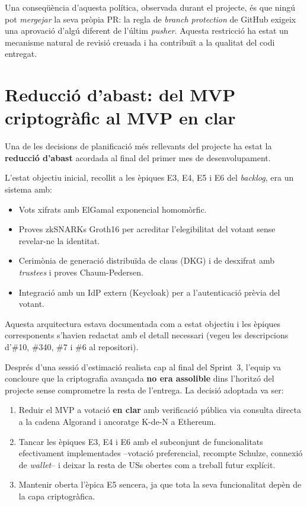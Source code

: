 Una conseqüència d'aquesta política, observada durant el projecte, és que
ningú pot \emph{mergejar} la seva pròpia \ac{PR}: la regla de \emph{branch
protection} de GitHub exigeix una aprovació d'algú diferent de l'últim
\emph{pusher}. Aquesta restricció ha estat un mecanisme natural de revisió
creuada i ha contribuït a la qualitat del codi entregat.

\section{Reducció d'abast: del MVP criptogràfic al MVP en clar}
\label{sec:reduccio-abast}

Una de les decisions de planificació més rellevants del projecte ha estat la
\textbf{reducció d'abast} acordada al final del primer mes de desenvolupament.

L'estat objectiu inicial, recollit a les èpiques E3, E4, E5 i E6 del
\emph{backlog}, era un sistema amb:

\begin{itemize}
    \item Vots xifrats amb ElGamal exponencial homomòrfic.
    \item Proves \acsp{zkSNARK} Groth16 per acreditar l'elegibilitat del
    votant sense revelar-ne la identitat.
    \item Cerimònia de generació distribuïda de claus (DKG) i de
    desxifrat amb \emph{trustees} i proves Chaum-Pedersen.
    \item Integració amb un \ac{IdP} extern (Keycloak) per a
    l'autenticació prèvia del votant.
\end{itemize}

Aquesta arquitectura estava documentada com a estat objectiu i les
èpiques corresponents s'havien redactat amb el detall necessari (vegeu les
descripcions d'\#10, \#340, \#7 i \#6 al repositori).

Després d'una sessió d'estimació realista cap al final del Sprint~3, l'equip
va concloure que la criptografia avançada \textbf{no era assolible} dins
l'horitzó del projecte sense comprometre la resta de l'entrega. La decisió
adoptada va ser:

\begin{enumerate}
    \item Reduir el \ac{MVP} a votació \textbf{en clar} amb verificació
    pública via consulta directa a la cadena Algorand i ancoratge K-de-N a
    Ethereum.
    \item Tancar les èpiques E3, E4 i E6 amb el subconjunt de
    funcionalitats efectivament implementades --votació preferencial, recompte
    Schulze, connexió de \emph{wallet}-- i deixar la resta de \acsp{US}
    obertes com a treball futur explícit.
    \item Mantenir oberta l'èpica E5 sencera, ja que tota la seva
    funcionalitat depèn de la capa criptogràfica.
\end{enumerate}

